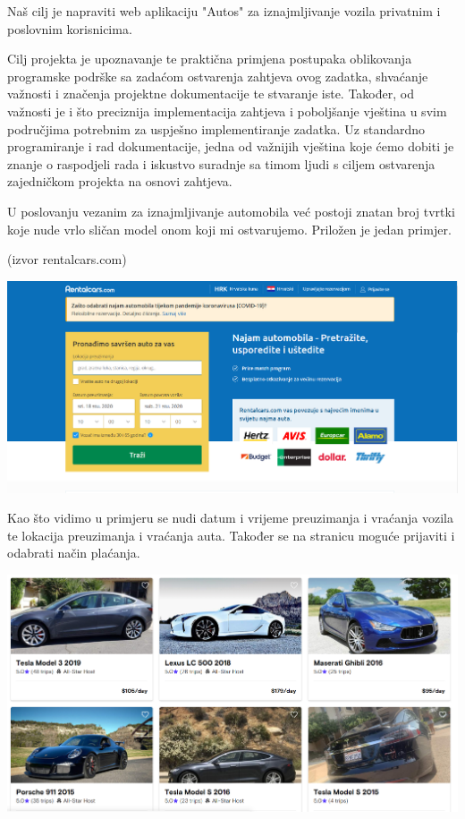 		 \text Naš cilj je napraviti web aplikaciju "Autos" za iznajmljivanje vozila privatnim i poslovnim korisnicima. \par 
		 \text Cilj projekta je upoznavanje te praktična primjena postupaka oblikovanja programske podrške sa zadaćom ostvarenja zahtjeva ovog zadatka, shvaćanje važnosti i značenja projektne dokumentacije te stvaranje iste. Također, od važnosti je i što preciznija implementacija zahtjeva i poboljšanje vještina u svim područjima potrebnim za uspješno implementiranje zadatka. Uz standardno programiranje i rad dokumentacije, jedna od važnijih vještina koje ćemo dobiti je znanje o raspodjeli rada i iskustvo suradnje sa timom ljudi s ciljem ostvarenja zajedničkom projekta na osnovi zahtjeva. \par 
		 \text U poslovanju vezanim za iznajmljivanje automobila već postoji znatan broj tvrtki koje nude vrlo sličan model onom koji mi ostvarujemo. Priložen je jedan primjer. \par 
		 \text (izvor rentalcars.com)\par  
		 \includegraphics[scale=0.3]{slike/stranica1.png}
		 
		 \text Kao što vidimo u primjeru se nudi datum i vrijeme preuzimanja i vraćanja vozila te lokacija preuzimanja i vraćanja auta. Također se na stranicu moguće prijaviti i odabrati način plaćanja. \par 
		\includegraphics[scale=0.33]{slike/stranica2.png}
		
